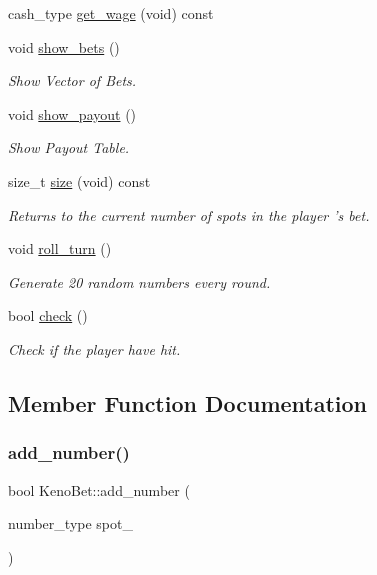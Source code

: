 \begin{DoxyCompactItemize}
cash\+\_\+type \mbox{\hyperlink{class_keno_bet_a5900dbff144d148671c015278261396e}{get\+\_\+wage}} (void) const
\item 
void \mbox{\hyperlink{class_keno_bet_a865301e99ebddfcee895d19eadb43fba}{show\+\_\+bets}} ()
\begin{DoxyCompactList}\small\item\em Show Vector of Bets. \end{DoxyCompactList}\item 
void \mbox{\hyperlink{class_keno_bet_a50b9ffd882ae67857ecce259f5411f1c}{show\+\_\+payout}} ()
\begin{DoxyCompactList}\small\item\em Show Payout Table. \end{DoxyCompactList}\item 
size\+\_\+t \mbox{\hyperlink{class_keno_bet_aa6f65b35514270c2707e60b9dea23ae9}{size}} (void) const
\begin{DoxyCompactList}\small\item\em Returns to the current number of spots in the player ’s bet. \end{DoxyCompactList}\item 
void \mbox{\hyperlink{class_keno_bet_a4f059f08a41fc0f41e30cf5dd7014d8f}{roll\+\_\+turn}} ()
\begin{DoxyCompactList}\small\item\em Generate 20 random numbers every round. \end{DoxyCompactList}\item 
bool \mbox{\hyperlink{class_keno_bet_a433e47b1968b0338ceecdd525a276f5e}{check}} ()
\begin{DoxyCompactList}\small\item\em Check if the player have hit. \end{DoxyCompactList}\end{DoxyCompactItemize}


\subsection{Member Function Documentation}
\mbox{\label{class_keno_bet_a670252422c82f61d89873e2917ab19ff}} 
\subsubsection{\texorpdfstring{add\+\_\+number()}{add\_number()}}
{\footnotesize\ttfamily bool Keno\+Bet\+::add\+\_\+number (\begin{DoxyParamCaption}\item[{number\+\_\+type}]{spot\+\_\+ }\end{DoxyParamCaption})}



